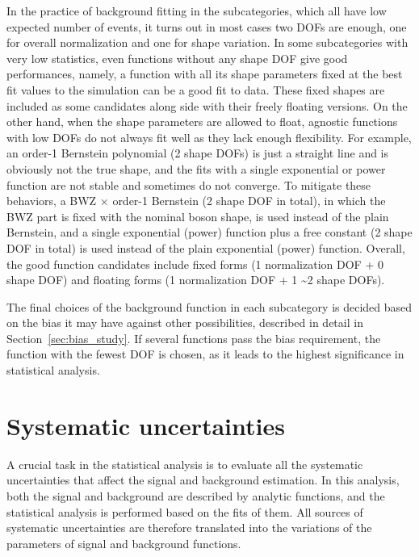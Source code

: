 In the practice of background fitting in the \VH subcategories, which all have low expected number of events,
it turns out in most cases two DOFs are enough, one for overall normalization and one for shape variation.
In some subcategories with very low statistics, even functions without any shape DOF give good performances,
namely, a function with all its shape parameters fixed at the best fit values to the simulation can be a good fit to data.
These fixed shapes are included as some candidates along side with their freely floating versions.
On the other hand, when the shape parameters are allowed to float, 
agnostic functions with low DOFs do not always fit well as they lack enough flexibility.
For example, an order-1 Bernstein polynomial (2 shape DOFs) is just a straight line and is obviously not the true \mmm shape,
and the fits with a single exponential or power function are not stable and sometimes do not converge.
To mitigate these behaviors, a BWZ $\times$ order-1 Bernstein (2 shape DOF in total), in which the BWZ part is fixed with the nominal \PZ boson shape, is used instead of the plain Bernstein,
and a single exponential (power) function plus a free constant (2 shape DOF in total) is used instead of the plain exponential (power) function.
Overall, the good function candidates include fixed forms (1 normalization DOF + 0 shape DOF) and 
floating forms (1 normalization DOF + 1 \sim 2 shape DOFs).

The final choices of the background function in each subcategory is decided based on 
the bias it may have against other possibilities, described in detail in Section~\ref{sec:bias_study}.
If several functions pass the bias requirement, the function with the fewest DOF is chosen, 
as it leads to the highest significance in statistical analysis.


\section{Systematic uncertainties}\label{sec:vh_systematics}

A crucial task in the statistical analysis is to evaluate all the systematic uncertainties 
that affect the signal and background estimation.
In this analysis, both the signal and background are described by analytic functions,  
and the statistical analysis is performed based on the fits of them.
All sources of systematic uncertainties are therefore translated into the 
variations of the parameters of signal and background functions.

